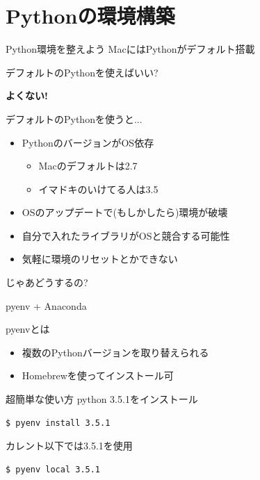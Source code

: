 \documentclass[12pt, dvipdfmx]{beamer}
\begin{document}
\section{Pythonの環境構築}
\begin{frame}{Python環境を整えよう}
    MacにはPythonがデフォルト搭載

    デフォルトのPythonを使えばいい?

    \pause
    \textbf{\alert{よくない!}}
\end{frame}
\begin{frame}{デフォルトのPythonを使うと...}
    \begin{itemize}
        \item PythonのバージョンがOS依存
        \begin{itemize}
            \item Macのデフォルトは2.7
            \item イマドキのいけてる人は3.5
        \end{itemize}
        \item OSのアップデートで(もしかしたら)環境が破壊
        \item 自分で入れたライブラリがOSと競合する可能性
        \item 気軽に環境のリセットとかできない
    \end{itemize}
\end{frame}
\begin{frame}{じゃあどうするの?}
    \begin{center}
        {\Huge pyenv + Anaconda}
    \end{center}
\end{frame}
\begin{frame}[fragile]{pyenvとは}
    \begin{itemize}
        \item 複数のPythonバージョンを取り替えられる
        \item Homebrewを使ってインストール可
    \end{itemize}
    \begin{exampleblock}{超簡単な使い方}
        python 3.5.1をインストール
\begin{lstlisting}[basicstyle=\small\ttfamily]
$ pyenv install 3.5.1
\end{lstlisting}

        カレント以下では3.5.1を使用
\begin{lstlisting}[basicstyle=\small\ttfamily]
$ pyenv local 3.5.1
\end{lstlisting}
    \end{exampleblock}
\end{frame}
\end{document}
